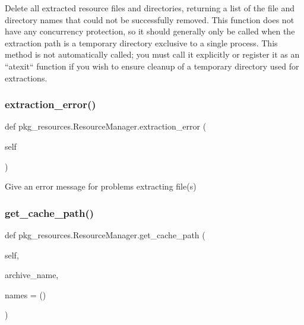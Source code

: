 \begin{DoxyVerb}Delete all extracted resource files and directories, returning a list
of the file and directory names that could not be successfully removed.
This function does not have any concurrency protection, so it should
generally only be called when the extraction path is a temporary
directory exclusive to a single process.  This method is not
automatically called; you must call it explicitly or register it as an
``atexit`` function if you wish to ensure cleanup of a temporary
directory used for extractions.
\end{DoxyVerb}
 \mbox{\label{classpkg__resources_1_1_resource_manager_a39f27f35ad11069273856a00d26df314}} 
\subsubsection{\texorpdfstring{extraction\+\_\+error()}{extraction\_error()}}
{\footnotesize\ttfamily def pkg\+\_\+resources.\+Resource\+Manager.\+extraction\+\_\+error (\begin{DoxyParamCaption}\item[{}]{self }\end{DoxyParamCaption})}

\begin{DoxyVerb}Give an error message for problems extracting file(s)\end{DoxyVerb}
 \mbox{\label{classpkg__resources_1_1_resource_manager_a79de123f8cc5bf426ae33bd6b6b21e0c}} 
\subsubsection{\texorpdfstring{get\+\_\+cache\+\_\+path()}{get\_cache\_path()}}
{\footnotesize\ttfamily def pkg\+\_\+resources.\+Resource\+Manager.\+get\+\_\+cache\+\_\+path (\begin{DoxyParamCaption}\item[{}]{self,  }\item[{}]{archive\+\_\+name,  }\item[{}]{names = {\ttfamily ()} }\end{DoxyParamCaption})}


